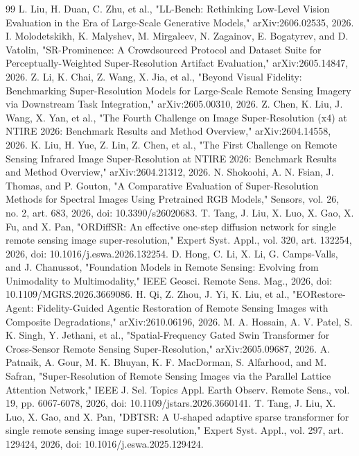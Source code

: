 \documentclass[pdflatex,sn-nature]{sn-jnl}
\begin{document}
\begin{thebibliography}{99}
L. Liu, H. Duan, C. Zhu, et al., "LL-Bench: Rethinking Low-Level Vision Evaluation in the Era of Large-Scale Generative Models," arXiv:2606.02535, 2026.
I. Molodetskikh, K. Malyshev, M. Mirgaleev, N. Zagainov, E. Bogatyrev, and D. Vatolin, "SR-Prominence: A Crowdsourced Protocol and Dataset Suite for Perceptually-Weighted Super-Resolution Artifact Evaluation," arXiv:2605.14847, 2026.
Z. Li, K. Chai, Z. Wang, X. Jia, et al., "Beyond Visual Fidelity: Benchmarking Super-Resolution Models for Large-Scale Remote Sensing Imagery via Downstream Task Integration," arXiv:2605.00310, 2026.
Z. Chen, K. Liu, J. Wang, X. Yan, et al., "The Fourth Challenge on Image Super-Resolution (x4) at NTIRE 2026: Benchmark Results and Method Overview," arXiv:2604.14558, 2026.
K. Liu, H. Yue, Z. Lin, Z. Chen, et al., "The First Challenge on Remote Sensing Infrared Image Super-Resolution at NTIRE 2026: Benchmark Results and Method Overview," arXiv:2604.21312, 2026.
N. Shokoohi, A. N. Fsian, J. Thomas, and P. Gouton, "A Comparative Evaluation of Super-Resolution Methods for Spectral Images Using Pretrained RGB Models," Sensors, vol. 26, no. 2, art. 683, 2026, doi: 10.3390/s26020683.
T. Tang, J. Liu, X. Luo, X. Gao, X. Fu, and X. Pan, "ORDiffSR: An effective one-step diffusion network for single remote sensing image super-resolution," Expert Syst. Appl., vol. 320, art. 132254, 2026, doi: 10.1016/j.eswa.2026.132254.
D. Hong, C. Li, X. Li, G. Camps-Valls, and J. Chanussot, "Foundation Models in Remote Sensing: Evolving from Unimodality to Multimodality," IEEE Geosci. Remote Sens. Mag., 2026, doi: 10.1109/MGRS.2026.3669086.
H. Qi, Z. Zhou, J. Yi, K. Liu, et al., "EORestore-Agent: Fidelity-Guided Agentic Restoration of Remote Sensing Images with Composite Degradations," arXiv:2610.06196, 2026.
M. A. Hossain, A. V. Patel, S. K. Singh, Y. Jethani, et al., "Spatial-Frequency Gated Swin Transformer for Cross-Sensor Remote Sensing Super-Resolution," arXiv:2605.09687, 2026.
A. Patnaik, A. Gour, M. K. Bhuyan, K. F. MacDorman, S. Alfarhood, and M. Safran, "Super-Resolution of Remote Sensing Images via the Parallel Lattice Attention Network," IEEE J. Sel. Topics Appl. Earth Observ. Remote Sens., vol. 19, pp. 6067-6078, 2026, doi: 10.1109/jstars.2026.3660141.
T. Tang, J. Liu, X. Luo, X. Gao, and X. Pan, "DBTSR: A U-shaped adaptive sparse transformer for single remote sensing image super-resolution," Expert Syst. Appl., vol. 297, art. 129424, 2026, doi: 10.1016/j.eswa.2025.129424.

\end{thebibliography}
\end{document}
